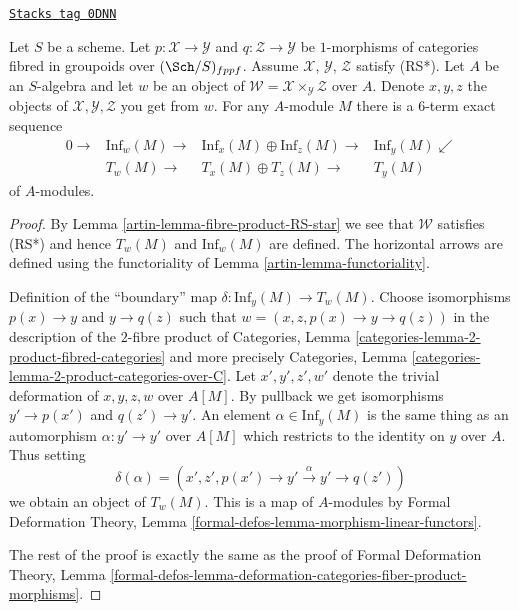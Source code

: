 \begin{lemma}
\label{artin-lemma-ses-inf-and-T}
\href{https://stacks.math.columbia.edu/tag/0DNN}{\texttt{Stacks tag 0DNN}}

Let $S$ be a scheme. Let $p : \mathcal{X} \to \mathcal{Y}$
and $q : \mathcal{Z} \to \mathcal{Y}$ be $1$-morphisms of categories
fibred in groupoids over $(\Sch/S)_{fppf}$. Assume $\mathcal{X}$,
$\mathcal{Y}$, $\mathcal{Z}$ satisfy (RS*).
Let $A$ be an $S$-algebra and let $w$ be an object of
$\mathcal{W} = \mathcal{X} \times_\mathcal{Y} \mathcal{Z}$ over $A$.
Denote $x, y, z$ the objects of $\mathcal{X}, \mathcal{Y}, \mathcal{Z}$
you get from $w$. For any $A$-module $M$ there is a $6$-term exact sequence
$$
\begin{array}{cccc}0 \longrightarrow & \text{Inf}_w(M) \longrightarrow & \text{Inf}_x(M) \oplus \text{Inf}_z(M) \longrightarrow & \text{Inf}_y(M) \swarrow \\  & T_w(M) \longrightarrow & T_x(M) \oplus T_z(M) \longrightarrow & T_y(M)\end{array}
$$
of $A$-modules.
\end{lemma}

\begin{proof}

By Lemma \ref{artin-lemma-fibre-product-RS-star} we see that $\mathcal{W}$
satisfies (RS*) and hence $T_w(M)$ and $\text{Inf}_w(M)$ are defined.
The horizontal arrows are defined using the functoriality of
Lemma \ref{artin-lemma-functoriality}.

\medskip\noindent
Definition of the ``boundary'' map $\delta : \text{Inf}_y(M) \to T_w(M)$.
Choose isomorphisms $p(x) \to y$ and $y \to q(z)$ such that
$w = (x, z, p(x) \to y \to q(z))$ in the description of
the $2$-fibre product of
Categories, Lemma \ref{categories-lemma-2-product-fibred-categories}
and more precisely
Categories, Lemma \ref{categories-lemma-2-product-categories-over-C}.
Let $x', y', z', w'$ denote the trivial deformation of
$x, y, z, w$ over $A[M]$. By pullback we get isomorphisms
$y' \to p(x')$ and $q(z') \to y'$. An element $\alpha \in \text{Inf}_y(M)$
is the same thing as an automorphism $\alpha : y' \to y'$
over $A[M]$ which restricts to the identity on $y$ over $A$.
Thus setting
$$
\delta(\alpha) =
(x', z', p(x') \to y' \xrightarrow{\alpha} y' \to q(z'))
$$
we obtain an object of $T_w(M)$. This is a map of $A$-modules
by Formal Deformation Theory, Lemma
\ref{formal-defos-lemma-morphism-linear-functors}.

\medskip\noindent
The rest of the proof is exactly the same as the proof of
Formal Deformation Theory, Lemma
\ref{formal-defos-lemma-deformation-categories-fiber-product-morphisms}.
\end{proof}


